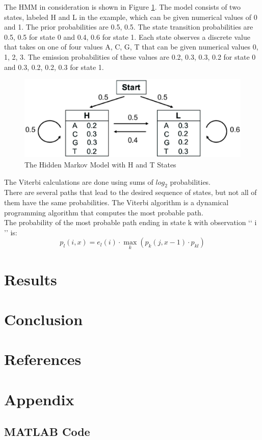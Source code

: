 \documentclass[12pt]{article}
\begin{document}
The HMM in consideration is shown in Figure \ref{fig:HMM}. The model consists of two states, labeled H and L in the example, which can be given numerical values of 0 and 1. The prior probabilities are {0.5, 0.5}. The state transition
probabilities are {0.5, 0.5} for state 0 and {0.4, 0.6} for state 1. Each state observes a discrete value that takes on one of four values {A, C, G, T } that can be given numerical values {0, 1, 2, 3}. The emission probabilities of these values are {0.2, 0.3, 0.3, 0.2} for state 0 and {0.3, 0.2, 0.2, 0.3} for state 1.
 
 \begin{figure}[H]
	\centering
	\includegraphics[scale=0.5]{HMM.eps}
	\caption{The Hidden Markov Model with H and T States}
	\label{fig:HMM}
\end{figure}

The Viterbi calculations are done using sums of $log_2$ probabilities. \\

There are several paths that lead to the desired sequence of states, but not all of them have the same probabilities. The Viterbi algorithm is a dynamical programming algorithm that computes the most probable path. \\

The probability of the most probable path ending in state k with observation \lq\lq{ i }\rq\rq{} is: 
\begin{equation}
	p_l(i,x) = e_l(i) \cdot \displaystyle\max_k(p_k(j,x-1) \cdot p_{kl})
\end{equation}





\section{Results}

\section{Conclusion}

\section*{References}

\section*{Appendix}

\subsection*{MATLAB Code}
%
\end{document}
